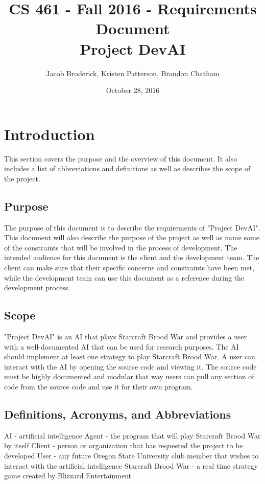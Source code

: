 \documentclass[10pt,letterpaper,onecolumn,draftclsnofoot]{IEEEtran}
\begin{document}
\begin{titlepage}

  \title{CS 461 - Fall 2016 - Requirements Document \\ Project DevAI}
  \author{Jacob Broderick, Kristen Patterson, Brandon Chatham}
  \date{October 28, 2016}
  \maketitle
  \vspace{4cm}

\end{titlepage}

\tableofcontents
\newpage

\section{Introduction}
This section covers the purpose and the overview of this document. It also includes a list of abbreviations and definitions as well as describes the scope of the project.

\subsection{Purpose}
The purpose of this document is to describe the requirements of "Project DevAI". This document will also describe the purpose of the project as well as name some of the constraints that will be involved in the process of development. The intended audience for this document is the client and the development team. The client can make sure that their specific concerns and constraints have been met, while the development team can use this document as a reference during the development process.

\subsection{Scope}
"Project DevAI" is an AI that plays Starcraft Brood War and provides a user with a well-documented AI that can be used for research purposes. The AI should implement at least one strategy to play Starcraft Brood War. A user can interact with the AI by opening the source code and viewing it. The source code must be highly documented and modular that way users can pull any section of code from the source code and use it for their own program.

\subsection{Definitions, Acronyms, and Abbreviations}
AI - artificial intelligence
Agent - the program that will play Starcraft Brood War by itself
Client - person or organization that has requested the project to be developed
User - any future Oregon State University club member that wishes to interact with the artificial intelligence
Starcraft Brood War - a real time strategy game created by Blizzard Entertainment
\end{document}
